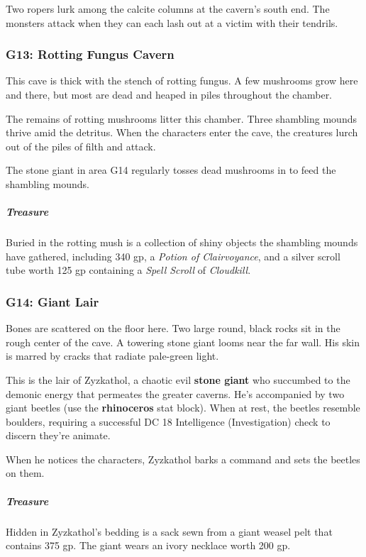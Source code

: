 \documentclass[10pt,a4paper,twoside,bg=print,twocolumn,openany,nodeprecatedcode]{dndbook}
\begin{document}
Two ropers lurk among the calcite columns at the cavern's south end. The monsters attack when they can each lash out at a victim with their tendrils.

\subsubsection{G13: Rotting Fungus Cavern}
\begin{DndReadAloud}{}
This cave is thick with the stench of rotting fungus. A few mushrooms grow here and there, but most are dead and heaped in piles throughout the chamber.

\end{DndReadAloud}

The remains of rotting mushrooms litter this chamber. Three shambling mounds thrive amid the detritus. When the characters enter the cave, the creatures lurch out of the piles of filth and attack.

The stone giant in area G14 regularly tosses dead mushrooms in to feed the shambling mounds.

\subparagraph{Treasure}
Buried in the rotting mush is a collection of shiny objects the shambling mounds have gathered, including 340 gp, a \textit{Potion of Clairvoyance}, and a silver scroll tube worth 125 gp containing a \textit{Spell Scroll} of \textit{Cloudkill}.

\subsubsection{G14: Giant Lair}
\begin{DndReadAloud}{}
Bones are scattered on the floor here. Two large round, black rocks sit in the rough center of the cave. A towering stone giant looms near the far wall. His skin is marred by cracks that radiate pale-green light.

\end{DndReadAloud}

This is the lair of Zyzkathol, a chaotic evil \textbf{stone giant} who succumbed to the demonic energy that permeates the greater caverns. He's accompanied by two giant beetles (use the \textbf{rhinoceros} stat block). When at rest, the beetles resemble boulders, requiring a successful DC 18 Intelligence (Investigation) check to discern they're animate.

When he notices the characters, Zyzkathol barks a command and sets the beetles on them.

\subparagraph{Treasure}
Hidden in Zyzkathol's bedding is a sack sewn from a giant weasel pelt that contains 375 gp. The giant wears an ivory necklace worth 200 gp.
\end{document}
